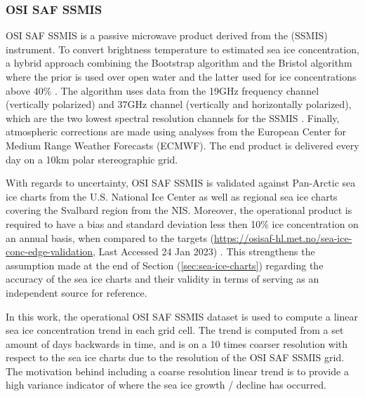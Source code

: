 \documentclass[../main/thesis.tex]{subfiles}
\begin{document}
\subsubsection{OSI SAF SSMIS}
\label{sec:osisafssmis}
OSI SAF SSMIS is a passive microwave product derived from the (SSMIS) instrument. To convert brightness temperature to estimated sea ice concentration, a hybrid approach combining the Bootstrap algorithm \citep{Comiso1997} and the Bristol algorithm \citep{Smith1996} where the prior is used over open water and the latter used for ice concentrations above 40\% \citep{Tonboe2017}. The algorithm uses data from the 19GHz frequency channel (vertically polarized) and 37GHz channel (vertically and horizontally polarized), which are the two lowest spectral resolution channels for the SSMIS \cite{Tonboe2017}. Finally, atmospheric corrections are made using analyses from the European Center for Medium Range Weather Forecasts (ECMWF). The end product is delivered every day on a 10km polar stereographic grid.

With regards to uncertainty, OSI SAF SSMIS is validated against Pan-Arctic sea ice charts from the U.S. National Ice Center as well as regional sea ice charts covering the Svalbard region from the NIS. Moreover, the operational product is required to have a bias and standard deviation less then 10\% ice concentration on an annual basis, when compared to the targets (\url{https://osisaf-hl.met.no/sea-ice-conc-edge-validation}, Last Accessed 24 Jan 2023) \citep{Lavelle2017}. This strengthens the assumption made at the end of Section (\ref{sec:sea-ice-charts}) regarding the accuracy of the sea ice charts and their validity in terms of serving as an independent source for reference.

In this work, the operational OSI SAF SSMIS dataset is used to compute a linear sea ice concentration trend in each grid cell. The trend is computed from a set amount of days backwards in time, and is on a 10 times coarser resolution with respect to the sea ice charts due to the resolution of the OSI SAF SSMIS grid. The motivation behind including a coarse resolution linear trend is to provide a high variance indicator of where the sea ice growth / decline has occurred.
\end{document}
